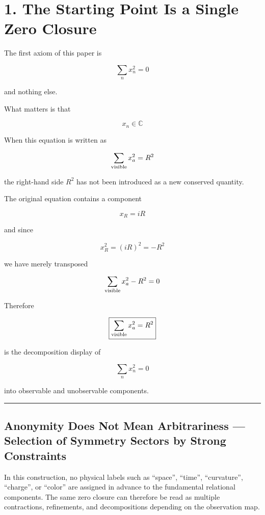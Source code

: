\documentclass[
  a4paper,
]{article}
\begin{document}
\section{1. The Starting Point Is a Single Zero
Closure}\label{the-starting-point-is-a-single-zero-closure}

The first axiom of this paper is

\[
\boxed{
\sum_n x_n^2=0
}
\]

and nothing else.

What matters is that

\[
x_n\in\mathbb C
\]

When this equation is written as

\[
\sum_{\rm visible} x_a^2
=
R^2
\]

the right-hand side \(R^2\) has not been introduced as a new conserved
quantity.

The original equation contains a component

\[
x_R=iR
\]

and since

\[
x_R^2=(iR)^2=-R^2
\]

we have merely transposed

\[
\sum_{\rm visible}x_a^2-R^2=0
\]

Therefore

\[
\boxed{
\sum_{\rm visible}x_a^2=R^2
}
\]

is the decomposition display of

\[
\boxed{
\sum_nx_n^2=0
}
\]

into observable and unobservable components.

\begin{center}\rule{0.5\linewidth}{0.5pt}\end{center}

\subsection{Anonymity Does Not Mean Arbitrariness --- Selection of
Symmetry Sectors by Strong
Constraints}\label{anonymity-does-not-mean-arbitrariness-selection-of-symmetry-sectors-by-strong-constraints}

In this construction, no physical labels such as ``space'', ``time'',
``curvature'', ``charge'', or ``color'' are assigned in advance to the
fundamental relational components. The same zero closure can therefore
be read as multiple contractions, refinements, and decompositions
depending on the observation map.
\end{document}
